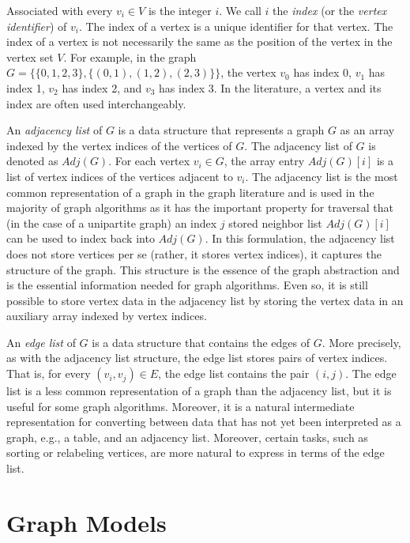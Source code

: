 Associated with every $v_i \in V$ is the integer $i$.  We call $i$ the \emph{index}
(or the \emph{vertex identifier}) of $v_i$.  The index of a vertex is a unique
identifier for that vertex.  The index of a vertex is not necessarily the same
as the position of the vertex in the vertex set $V$.  For example, in the graph
$G = \{ \{ 0, 1, 2, 3 \}, \{ (0, 1), (1, 2), (2, 3) \} \}$, the vertex $v_0$ has index 0,
$v_1$ has index 1, $v_2$ has index 2, and $v_3$ has index 3.  In the literature,
a vertex and its index are often used interchangeably.

An \emph{adjacency list} of $G$ is a data structure that represents a graph $G$ as an array
indexed by the vertex indices of the vertices of $G$.
The adjacency list of $G$ is denoted as $Adj(G)$.
For each vertex $v_i \in G$, the array entry $Adj(G)[i]$ is a list of
vertex indices of the vertices adjacent to $v_i$.
The adjacency list is the most common representation of a graph in the graph literature
and is used in the majority of graph algorithms as it has the important
property for traversal that (in the case of a unipartite graph)
an index $j$ stored neighbor list $Adj(G)[i]$ can
be used to index back into $Adj(G)$.  In this formulation, the adjacency list
does not store vertices per se (rather, it stores vertex indices), it captures the
structure of the graph.  This structure is the essence of the graph abstraction and
is the essential information needed for graph algorithms.
Even so, it is still possible to store vertex data in the adjacency list by storing
the vertex data in an auxiliary array indexed by vertex indices.

An \emph{edge list} of $G$ is a data structure that contains the edges of $G$.  More precisely, as
with the adjacency list structure, the edge list stores pairs of vertex indices.  That is, for
every $(v_i, v_j) \in E$, the edge list contains the pair $(i, j)$.  The edge list is
a less common representation of a graph than the adjacency list, but it is useful for
some graph algorithms.  Moreover, it is a natural intermediate representation for
converting between data that has not yet been interpreted as a graph, e.g., a table,
and an adjacency list.  Moreover, certain tasks, such as sorting or relabeling vertices, are
more natural to express in terms of the edge list.



\section{Graph Models}

